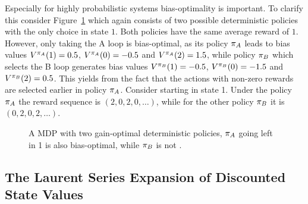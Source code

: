 \documentclass[envcountsame]{llncs}
\begin{document}
Especially for highly probabilistic systems bias-optimality is important. To clarify this consider
Figure~\ref{fig:three-states} which again consists of two possible deterministic policies with the
only choice in state \(1\). Both policies have the same average reward of \(1\). However, only
taking the A loop is bias-optimal, as its policy \(\pi_{A}\) leads to bias values
\(V^{\pi_{A}}(1)=0.5\), \(V^{\pi_{A}}(0)=-0.5\) and \(V^{\pi_{A}}(2)=1.5\), while policy
\(\pi_{B}\) which selects the B loop generates bias values \(V^{\pi_{B}}(1)=-0.5\),
\(V^{\pi_{B}}(0)=-1.5\) and \(V^{\pi_{B}}(2)=0.5\).
%
This yields from the fact that the actions with non-zero rewards are selected earlier in policy
\(\pi_{A}\). Consider starting in state 1. Under the policy \(\pi_{A}\) the reward sequence is
\((2,0,2,0,\ldots)\), while for the other policy \(\pi_{B}\) it is \((0,2,0,2,\ldots)\).


\begin{figure}[t!]
  \centering
  \caption{\label{fig:three-states} A MDP with two gain-optimal deterministic policies, \(\pi_{A}\)
    going left in 1 is also bias-optimal, while \(\pi_{B}\) is not \citep[Adapted
    from][]{Mahadevan96_AverageRewardReinforcementLearningFoundationsAlgorithmsAndEmpiricalResults}.}
\end{figure}


\subsection{The Laurent Series Expansion of Discounted State Values}
\label{subsec:The_Laurent_Series_Expansion_of_Discounted_State_Values}
\end{document}
